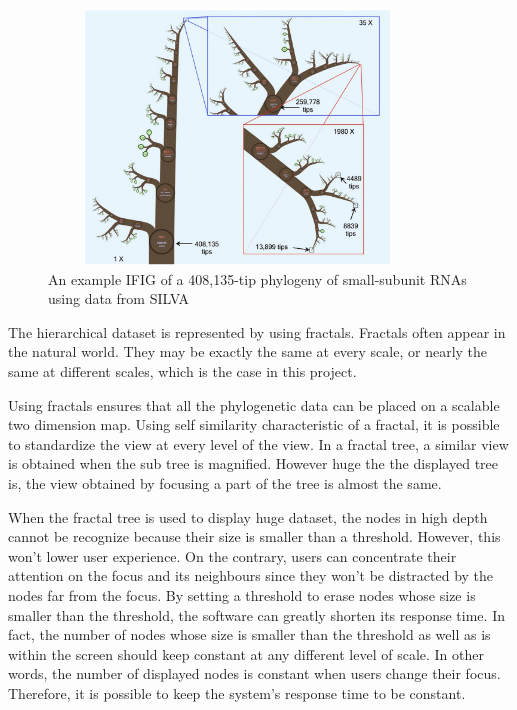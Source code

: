 \documentclass[MSc]{icldt}
\begin{document}
\begin{figure}[H]
  \centering
  \includegraphics [width=10cm,height=6.8cm]{oneZoomExample}
  \caption{An example IFIG of a 408,135-tip phylogeny of small-subunit RNAs using data from SILVA}
  \label{fig:oneZoomExample}
\end{figure}

The hierarchical dataset is represented by using fractals. Fractals often appear in the natural world.\cite{fractal1}\cite{fractal2} They may be exactly the same at every scale, or nearly the same at different scales,\cite{fractalWiki1}\cite{fractalWiki2}\cite{fractalWiki3}\cite{fractalWiki4}  which is the case in this project. 

Using fractals ensures that all the phylogenetic data can be placed on a scalable two dimension map. 
Using self similarity characteristic of a fractal, it is possible to standardize the view at every level of the view. In a fractal tree, a similar view is obtained when the sub tree is magnified. However huge the the displayed tree is, the view obtained by focusing a part of the tree is almost the same.\cite{fractalMath}

When the fractal tree is used to display huge dataset, the nodes in high depth cannot be recognize because their size is smaller than a threshold. However, this won't lower user experience. On the contrary, users can concentrate their attention on the focus and its neighbours since they won't be distracted by the nodes far from the focus. By setting a threshold to erase nodes whose size is smaller than the threshold, the software can greatly shorten its response time. In fact, the number of nodes whose size is smaller than the threshold as well as is within the screen should keep constant at any different level of scale. In other words, the number of displayed nodes is constant when users change their focus. Therefore, it is possible to keep the system's response time to be constant.\cite{fractalMath}
\end{document}
